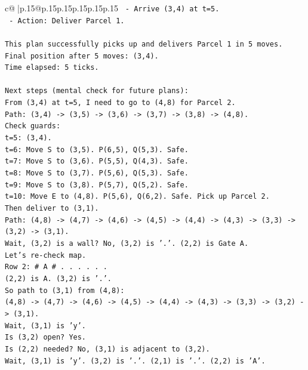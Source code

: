 \documentclass{article}
\begin{document}
{\begin{supertabular}{c@{$\;$}|p{.15\linewidth}@{}p{.15\linewidth}p{.15\linewidth}p{.15\linewidth}p{.15\linewidth}p{.15\linewidth}}
{{{\texttt{  {-} Arrive (3,4) at t=5.} \\
\texttt{  {-} Action: Deliver Parcel 1.} \\
\\ 
\texttt{This plan successfully picks up and delivers Parcel 1 in 5 moves.} \\
\texttt{Final position after 5 moves: (3,4).} \\
\texttt{Time elapsed: 5 ticks.} \\
\\ 
\texttt{Next steps (mental check for future plans):} \\
\texttt{From (3,4) at t=5, I need to go to (4,8) for Parcel 2.} \\
\texttt{Path: (3,4) {-}> (3,5) {-}> (3,6) {-}> (3,7) {-}> (3,8) {-}> (4,8).} \\
\texttt{Check guards:} \\
\texttt{t=5: (3,4).} \\
\texttt{t=6: Move S to (3,5). P(6,5), Q(5,3). Safe.} \\
\texttt{t=7: Move S to (3,6). P(5,5), Q(4,3). Safe.} \\
\texttt{t=8: Move S to (3,7). P(5,6), Q(5,3). Safe.} \\
\texttt{t=9: Move S to (3,8). P(5,7), Q(5,2). Safe.} \\
\texttt{t=10: Move E to (4,8). P(5,6), Q(6,2). Safe. Pick up Parcel 2.} \\
\texttt{Then deliver to (3,1).} \\
\texttt{Path: (4,8) {-}> (4,7) {-}> (4,6) {-}> (4,5) {-}> (4,4) {-}> (4,3) {-}> (3,3) {-}> (3,2) {-}> (3,1).} \\
\texttt{Wait, (3,2) is a wall? No, (3,2) is '.'. (2,2) is Gate A.} \\
\texttt{Let's re{-}check map.} \\
\texttt{Row 2: \# A \# . . . . . .} \\
\texttt{(2,2) is A. (3,2) is '.'.} \\
\texttt{So path to (3,1) from (4,8):} \\
\texttt{(4,8) {-}> (4,7) {-}> (4,6) {-}> (4,5) {-}> (4,4) {-}> (4,3) {-}> (3,3) {-}> (3,2) {-}> (3,1).} \\
\texttt{Wait, (3,1) is 'y'.} \\
\texttt{Is (3,2) open? Yes.} \\
\texttt{Is (2,2) needed? No, (3,1) is adjacent to (3,2).} \\
\texttt{Wait, (3,1) is 'y'. (3,2) is '.'. (2,1) is '.'. (2,2) is 'A'.} \\
}}}
\end{supertabular}}
\end{document}
